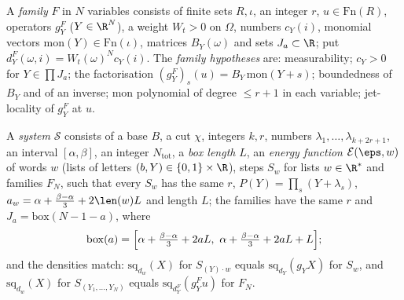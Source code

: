 \begin{definition}\label{pf:thmS-carrier:sys}
A \emph{family} $F$ in $N$ variables consists of finite sets $R,\iota$, an integer $r$, $u\in\mathrm{Fn}(R)$, operators $g^F_{Y}$
($Y\in\R^N$), a weight $W_t>0$ on $\Omega$, numbers $c_Y(i)$, monomial vectors $\mathrm{mon}(Y)\in\mathrm{Fn}(\iota)$,
matrices $B_Y(\omega)$ and sets $J_a\subset\R$; put $d^F_Y(\omega,i)=W_t(\omega)^Nc_Y(i)$. The \emph{family hypotheses} are:
measurability; $c_Y>0$ for $Y\in\prod J_a$; the factorisation $(g^F_Y)_s(u)=B_Y\,\mathrm{mon}(Y+s)$; boundedness of $B_Y$ and
of an inverse; $\mathrm{mon}$ polynomial of degree $\le r+1$ in each variable; jet-locality of $g^F_Y$ at $u$.

A \emph{system} $\mathcal S$ consists of a base $B$, a cut $\chi$, integers $k,r$, numbers $\lambda_1,\dots,\lambda_{k+2r+1}$,
an interval $[\alpha,\beta]$, an integer $N_{\mathrm{tot}}$, a \emph{box length} $L$, an \emph{energy function}
$\thmScarrierEn(\eps,w)$ of words $w$ (lists of letters $(b,Y)\in\{0,1\}\times\R$), steps $S_w$ for lists $w\in\R^*$ and
families $F_N$, such that every $S_w$ has the same $r$, $P(Y)=\prod_s(Y+\lambda_s)$, $a_w=\alpha+\frac{\beta-\alpha}3
+2\len(w)L$ and length $L$; the families have the same $r$ and $J_a=\mathrm{box}(N-1-a)$, where
\[
\mathrm{box}(a)=\Bigl[\alpha+\tfrac{\beta-\alpha}3+2aL,\ \alpha+\tfrac{\beta-\alpha}3+2aL+L\Bigr];
\]
and the densities match: $\mathrm{sq}_{d_w}(X)$ for $S_{(Y)\cdot w}$ equals $\mathrm{sq}_{d_Y}(g_YX)$ for $S_w$, and
$\mathrm{sq}_{d_w}(X)$ for $S_{(Y_1,\dots,Y_N)}$ equals $\mathrm{sq}_{d^F_Y}(g^F_Yu)$ for $F_N$.


\end{definition}

